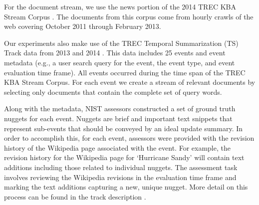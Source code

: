 For the document stream, we use the news portion of the 2014 TREC KBA Stream 
Corpus \cite{frank2012building}. The documents from this corpus come from 
hourly crawls of the web covering October 2011 through February 2013. 


Our experiments also make use of the TREC Temporal Summarization (TS) Track
 data from 2013 and 2014 \cite{aslam2013trec}.  This data includes 25 events 
and event metadata (e.g., a user search query for the event, the event type, 
and event evaluation time frame). All events occurred during the time span of 
the TREC KBA Stream Corpus. For each event we create a stream of relevant 
documents by selecting only documents that contain the complete set of query 
words. 


Along with the metadata, NIST assessors constructed a set of ground truth 
nuggets for each event. Nuggets are brief and important text snippets that 
represent sub-events that should be conveyed by an ideal update summary. 
In order to accomplish this, for each event, assessors were provided with the
revision history of the Wikipedia page associated with the event. For example,
the revision history for the Wikipedia page for `Hurricane Sandy' will contain
text additions including those related to individual nuggets.  The assessment
task involves reviewing the Wikipedia revisions in the evaluation time frame 
and marking the text additions capturing a new, unique nugget.  More detail
on this process can be found in the track description \cite{aslam2013trec}.
